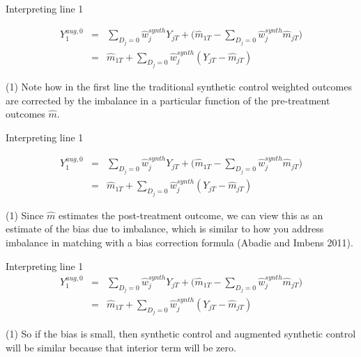 \documentclass{beamer}
\begin{document}
\begin{frame}{Interpreting line 1}

\begin{eqnarray*}
Y_1^{aug,0} &=& \sum_{D_j=0} \widehat{w}_j^{synth} Y_{jT} + \bigg (\widehat{m}_{1T} - \sum_{D_j=0} \widehat{w}_j^{synth}\widehat{m}_{jT} \bigg ) \\
&=& \widehat{m}_{1T} + \sum_{D_j=0} \widehat{w}_j^{synth} (Y_{jT} - \widehat{m}_{jT})
\end{eqnarray*}

(1) Note how in the first line the traditional synthetic control weighted outcomes are corrected by the imbalance in a particular function of the pre-treatment outcomes $\widehat{m}$. 
\end{frame}




\begin{frame}{Interpreting line 1}

\begin{eqnarray*}
Y_1^{aug,0}  &=& \sum_{D_j=0} \widehat{w}_j^{synth} Y_{jT} + \bigg (\widehat{m}_{1T} - \sum_{D_j=0} \widehat{w}_j^{synth}\widehat{m}_{jT} \bigg ) \\
&=& \widehat{m}_{1T} + \sum_{D_j=0} \widehat{w}_j^{synth} (Y_{jT} - \widehat{m}_{jT})
\end{eqnarray*}

(1) Since $\widehat{m}$ estimates the post-treatment outcome, we can view this as an estimate of the bias due to imbalance, which is similar to how you address imbalance in matching with a bias correction formula (Abadie and Imbens 2011). 

\end{frame}




\begin{frame}{Interpreting line 1}
\begin{eqnarray*}
Y_1^{aug,0}  &=& \sum_{D_j=0} \widehat{w}_j^{synth} Y_{jT} + \bigg (\widehat{m}_{1T} - \sum_{D_j=0} \widehat{w}_j^{synth}\widehat{m}_{jT} \bigg ) \\
&=& \widehat{m}_{1T} + \sum_{D_j=0} \widehat{w}_j^{synth} (Y_{jT} - \widehat{m}_{jT})
\end{eqnarray*}

(1) So if the bias is small, then synthetic control and augmented synthetic control will be similar because that interior term will be zero.

\end{frame}
\end{document}
